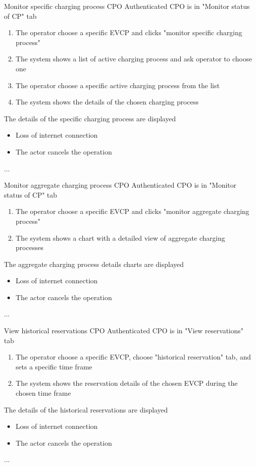 \usecase
{Monitor specific charging process} %
{CPO} %
{Authenticated CPO is in "Monitor status of CP" tab} %
{ %
    \begin{enumerate}
        \item The operator choose a specific EVCP and clicks "monitor specific charging process"
        \item The system shows a list of active charging process and ask operator to choose one
        \item The operator choose a specific active charging process from the list
        \item The system shows the details of the chosen charging process
    \end{enumerate}
}
{The details of the specific charging process are displayed} %
{ %
    \begin{itemize}
        \item Loss of internet connection
        \item The actor cancels the operation
    \end{itemize}
}
{ %
    ...
}

\usecase
{Monitor aggregate charging process} %
{CPO} %
{Authenticated CPO is in "Monitor status of CP" tab} %
{ %
    \begin{enumerate}
        \item The operator choose a specific EVCP and clicks "monitor aggregate charging process"
        \item The system shows a chart with a detailed view of aggregate charging processes
    \end{enumerate}
}
{The aggregate charging process details charts are displayed} %
{ %
    \begin{itemize}
        \item Loss of internet connection
        \item The actor cancels the operation
    \end{itemize}
}
{ %
    ...
}

\usecase
{View historical reservations} %
{CPO} %
{Authenticated CPO is in "View reservations" tab} %
{ %
    \begin{enumerate}
        \item The operator choose a specific EVCP, choose "historical reservation" tab, and sets a specific time frame
        \item The system shows the reservation details of the chosen EVCP during the chosen time frame
    \end{enumerate}
}
{The details of the historical reservations are displayed} %
{ %
    \begin{itemize}
        \item Loss of internet connection
        \item The actor cancels the operation
    \end{itemize}
}
{ %
    ...
}


